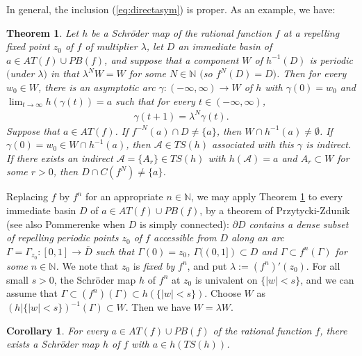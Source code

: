 \documentclass[a4paper,12pt]{amsart}
\theoremstyle{plain}
\newtheorem{mainth}{Theorem}
\newtheorem{maincoro}{Corollary}
\theoremstyle{definition}
\theoremstyle{remark}
\numberwithin{equation}{section}
\begin{document}
In general, the inclusion (\ref{eq:directasym}) is proper. 
As an example, we have: 
\begin{mainth}\label{th:attpara}
 Let $h$ be a Schr\"oder map of the rational function $f$
 at a repelling fixed point $z_0$ of $f$ of multiplier $\lambda$,
 let $D$ an immediate basin of $a\in{\mathit{AT}}(f)\cup{\mathit{PB}}(f)$,
 and suppose that a component $W$ of $h^{-1}(D)$ is periodic $($under $\lambda)$
 in that $\lambda^N W=W$ for some $N\in{\mathbb{N}}$ $($so $f^N(D)=D)$.
 Then for every $w_0\in W$, there is an asymptotic arc 
 $\gamma:(-\infty,\infty)\to W$ of $h$ with $\gamma(0)=w_0$ and
 $\lim_{t\to\infty}h(\gamma(t))=a$ such that for every $t\in(-\infty,\infty)$,
 \begin{gather}
  \gamma(t+1)=\lambda^N\gamma(t).\label{eq:translation}
 \end{gather} 
 Suppose that $a\in{\mathit{AT}}(f)$.
 If $f^{-N}(a)\cap D\neq\{a\}$, then $W\cap h^{-1}(a)\neq\emptyset$. 
 If $\gamma(0)=w_0\in W\cap h^{-1}(a)$,
 then $\mathcal{A}\in{\mathit{TS}}(h)$ associated with this $\gamma$
 is indirect.
 If there exists an indirect $\mathcal{A}=\{A_r\}\in{\mathit{TS}}(h)$ 
 with $h(\mathcal{A})=a$ and $A_r\subset W$ for some $r>0$,
 then $D\cap C(f^N)\neq\{a\}$.
\end{mainth}

Replacing $f$ by $f^n$ for an appropriate $n\in{\mathbb{N}}$,
we may apply Theorem \ref{th:attpara} to every immediate basin $D$
of $a\in{\mathit{AT}}(f)\cup{\mathit{PB}}(f)$, 
by a theorem of Przytycki-Zdunik \cite[Theorem A]{PZ94}
(see also Pommerenke \cite[\S 2]{Pommerenke86} when
$D$ is simply connected):
{\itshape $\partial D$ contains a dense subset of
repelling periodic points $z_0$ of $f$ 
accessible from $D$ along an arc $\Gamma=\Gamma_{z_0}:[0,1]\to\overline{D}$
such that $\Gamma(0)=z_0$, $\Gamma((0,1])\subset D$ and 
$\Gamma\subset f^n(\Gamma)$ for some $n\in{\mathbb{N}}$.}
We note that $z_0$ is {\itshape fixed by} $f^n$, and put $\lambda:=(f^n)'(z_0)$.
For all small $s>0$, the Schr\"oder map $h$ of $f^n$ at $z_0$ is univalent on $\{|w|<s\}$,
and we can assume that $\Gamma\subset(f^n)(\Gamma)\subset h(\{|w|<s\})$.
Choose $W$ as $(h|\{|w|<s\})^{-1}(\Gamma)\subset W$.
Then we have $W=\lambda W$.

\begin{maincoro}\label{th:attparaconverse}
 For every $a\in{\mathit{AT}}(f)\cup{\mathit{PB}}(f)$ of the rational function $f$,
 there exists a Schr\"oder map $h$ of $f$ with $a\in h({\mathit{TS}}(h))$.
\end{maincoro}
\end{document}
